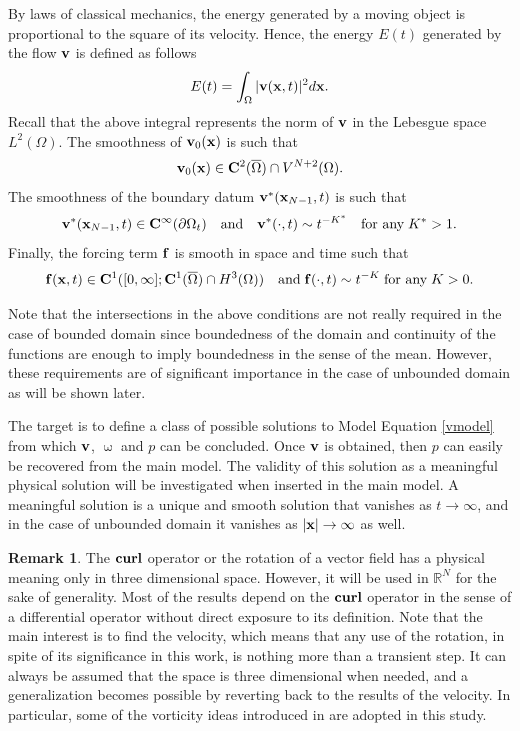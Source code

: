\documentclass[a4 paper, 11pt,twoside]{article}
\newcommand{\Bf}[1]{{\bf{#1}}}
\newcommand{\V}{{\bf{v}}}
\newcommand{\X}{{\bf{x}}}
\newcommand{\0}{\Bf{0}}
\newcommand{\F}{{\bf{f}}}
\theoremstyle{definition}
\newtheorem*{rem}{Remark}
\begin{document}
By laws of classical mechanics, the energy generated by a moving object is proportional to the square of its velocity. Hence, the energy $E(t)$ generated by the flow $\V$ is defined as follows
\begin{equation}
E(t)=\int_\Omega|\V(\X,t)|^2d\X.
\label{energyID}
\end{equation}
Recall that the above integral represents the norm of $\V$ in the Lebesgue space $L^2(\Omega)$. The smoothness of $\V_0(\X)$ is such that
\begin{equation}
\V_0(\X)\in\Bf{C}^2(\overline{\Omega})\cap V^{N+2}(\Omega).
\label{initialdata}
\end{equation}
The smoothness of the boundary datum $\V^*(\X_{N-1},t)$ is such that
\begin{equation}
\V^*(\X_{N-1},t)\in\Bf{C}^\infty(\partial\Omega_t)\quad\text{and}\quad \V^*(\cdot,t)\sim t^{-K^*}\quad\text{for any}\;K^*>1.
\label{bounddata}
\end{equation}
Finally, the forcing term $\F$ is smooth in space and time such that
\begin{equation}
\F(\X,t)\in\Bf{C}^1([0,\infty]; \Bf{C}^1(\overline{\Omega})\cap {\color{black}H^3}(\Omega))\quad\text{and}\; \F(\cdot,t)\sim t^{-K}\;\text{for any}\;K>0.
\label{forcedata}
\end{equation}

Note that the intersections in the above conditions are not really required in the case of bounded domain since boundedness of the domain and continuity of the functions are enough to imply boundedness in the sense of the mean. However, these requirements are of significant importance in the case of unbounded domain as will be shown later.

The target is to define a class of possible solutions to Model Equation \eqref{vmodel} from which $\Bf{v}$, $\upomega$ and $p$ can be concluded. Once $\V$ is obtained, then $p$ can easily be recovered from the main model. The validity of this solution as a meaningful physical solution will be investigated when inserted in the main model. A meaningful solution is a unique and smooth solution that vanishes as $t\rightarrow\infty$, and in the case of unbounded domain it vanishes as $|\X|\rightarrow\infty$ as well.
\begin{rem}
The $\Bf{curl}$ operator or the rotation of a vector field has a physical meaning only in three dimensional space. However, it will be used in $\mathbb{R}^N$ for the sake of generality. Most of the results depend on the $\Bf{curl}$ operator in the sense of a differential operator without direct exposure to its definition. Note that the main interest is to find the velocity, which means that any use of the rotation, in spite of its significance in this work, is nothing more than a transient step. It can always be assumed that the space is three dimensional when needed, and a generalization becomes possible by reverting back to the results of the velocity. In particular, some of the vorticity ideas introduced in \cite{majda} are adopted in this study.
\end{rem}
\end{document}
